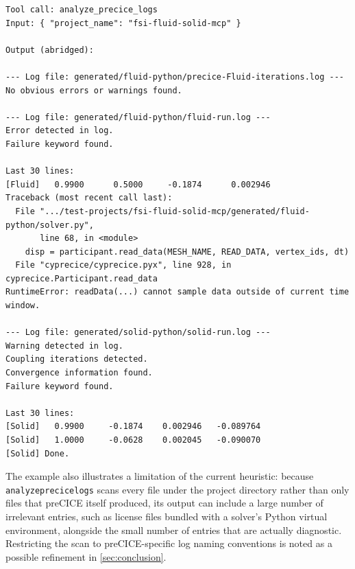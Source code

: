 \documentclass[
  numbers=noenddot,
  english,
  a4paper,
  twoside,
  bibliography=totoc,
  headsepline,
  cleardoublepage=empty,
  parskip=half,
  draft=false
]{scrbook}
\theoremstyle{break}
\renewcommand{\_}{\textunderscore\allowbreak}
\begin{document}
\begin{listing}[htbp]
\begin{verbatim}
Tool call: analyze_precice_logs
Input: { "project_name": "fsi-fluid-solid-mcp" }

Output (abridged):

--- Log file: generated/fluid-python/precice-Fluid-iterations.log ---
No obvious errors or warnings found.

--- Log file: generated/fluid-python/fluid-run.log ---
Error detected in log.
Failure keyword found.

Last 30 lines:
[Fluid]   0.9900      0.5000     -0.1874      0.002946
Traceback (most recent call last):
  File ".../test-projects/fsi-fluid-solid-mcp/generated/fluid-python/solver.py",
       line 68, in <module>
    disp = participant.read_data(MESH_NAME, READ_DATA, vertex_ids, dt)
  File "cyprecice/cyprecice.pyx", line 928, in cyprecice.Participant.read_data
RuntimeError: readData(...) cannot sample data outside of current time window.

--- Log file: generated/solid-python/solid-run.log ---
Warning detected in log.
Coupling iterations detected.
Convergence information found.
Failure keyword found.

Last 30 lines:
[Solid]   0.9900     -0.1874    0.002946   -0.089764
[Solid]   1.0000     -0.0628    0.002045   -0.090070
[Solid] Done.
\end{verbatim}
\caption{Abridged output of \texttt{analyze\_precice\_logs} for a fluid-structure interaction
         project with a fluid-side runtime error. The full, unabridged tool output additionally
         lists every other log and text file discovered under each participant's generated
         directory, most of which are unrelated to the simulation (for example, third-party
         license files bundled with installed Python packages) and are reported as containing
         no obvious errors.}
\label{lst:log-tool-example}
\end{listing}

The example also illustrates a limitation of the current heuristic: because
\texttt{analyze\_precice\_logs} scans every file under the project directory rather than only
files that preCICE itself produced, its output can include a large number of irrelevant
entries, such as license files bundled with a solver's Python virtual environment, alongside
the small number of entries that are actually diagnostic.
Restricting the scan to preCICE-specific log naming conventions is noted as a possible
refinement in \cref{sec:conclusion}.
\end{document}

